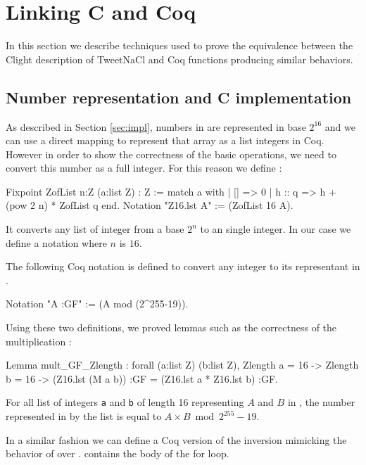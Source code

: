 \section{Linking C and Coq}

In this section we describe techniques used to prove the equivalence between the
Clight description of TweetNaCl and Coq functions producing similar behaviors.

\subsection{Number representation and C implementation}

As described in Section \ref{sec:impl}, numbers in  are represented
in base $2^{16}$ and we can use a direct mapping to represent that array as a list
integers in Coq. However in order to show the correctness of the basic operations,
we need to convert this number as a full integer. For this reason we define
:
\begin{Coq}
Fixpoint ZofList {n:Z} (a:list Z) : Z :=
  match a with
  | [] => 0
  | h :: q => h + (pow 2 n) * ZofList q
  end.
Notation "Z16.lst A" := (ZofList 16 A).
\end{Coq}
It converts any list of integer from a base $2^n$ to an single integer. In our
case we define a notation where $n$ is $16$.

The following Coq notation is defined to convert any integer to its representant
in \Zfield.
\begin{Coq}
Notation "A :GF" := (A mod (2^255-19)).
\end{Coq}

Using these two definitions, we proved lemmas such as the correctness of the
multiplication :
\begin{Coq}
Lemma mult_GF_Zlength :
  forall (a:list Z) (b:list Z),
  Zlength a = 16 ->
  Zlength b = 16 ->
   (Z16.lst (M a b)) :GF =
   (Z16.lst a * Z16.lst b) :GF.
\end{Coq}

For all list of integers \texttt{a} and \texttt{b} of length 16 representing
$A$ and $B$ in \Zfield, the number represented in \Zfield by the list 
is equal to $A \times B \bmod 2^{255}-19$.

In a similar fashion we can define a Coq version of the inversion mimicking
the behavior of  over .  contains
the body of the for loop.

